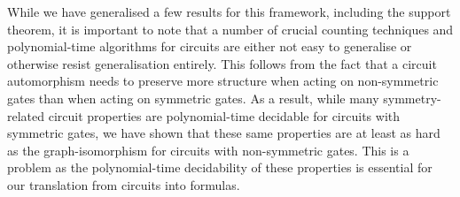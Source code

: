 \documentclass[../paper.tex]{subfiles}
\begin{document}
While we have generalised a few results for this framework, including the
support theorem, it is important to note that a number of crucial counting
techniques and polynomial-time algorithms for circuits are either not easy to
generalise or otherwise resist generalisation entirely. This follows from the
fact that a circuit automorphism needs to preserve more structure when acting on
non-symmetric gates than when acting on symmetric gates. As a result, while many
symmetry-related circuit properties are polynomial-time decidable for circuits
with symmetric gates, we have shown that these same properties are at least as
hard as the graph-isomorphism for circuits with non-symmetric gates. This is a
problem as the polynomial-time decidability of these properties is essential for
our translation from circuits into formulas.





\end{document}
